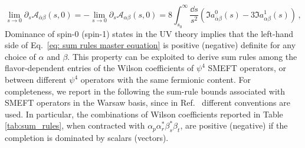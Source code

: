 \documentclass[a4paper,11pt]{article}
\begin{document}
%
\begin{equation}\label{eq: sum rules master equation}
    \lim_{s\rightarrow 0}\partial_s\mathcal{A}_{\overline \alpha\beta}(s,0) = -\lim_{s\rightarrow 0}\partial_s\mathcal{A}_{ \alpha\beta}(s,0) =8\int_{s_0}^\infty \dfrac{\dd s}{s^2}\left(\Im a_{\overline{\alpha}\beta}^{0}(s)-3\Im a_{\alpha\beta}^{1}(s)\right)\,,
\end{equation}
Dominance of spin-0 (spin-1) states in the UV theory implies that the left-hand side of Eq.~\eqref{eq: sum rules master equation} is positive (negative) definite for any choice of $\alpha$ and $\beta$.
This property can be exploited to derive sum rules among the flavor-dependent entries of the Wilson coefficients of $\psi^4$ SMEFT operators, or between different $\psi^4$ operators with the same fermionic content. For completeness, we report in the following the sum-rule bounds associated with SMEFT operators in the Warsaw basis, since in Ref.~\cite{Remmen:2020uze} different conventions are used.
In particular, the combinations of Wilson coefficients reported in Table \ref{tab:sum_rules}, when contracted with $\alpha_p \alpha_r^* \beta^*_s \beta_t$, are positive (negative) if the completion is dominated by scalars (vectors).
\end{document}
